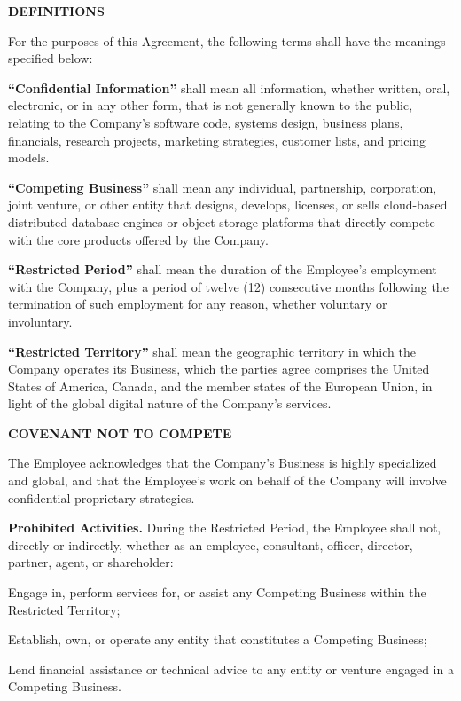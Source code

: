 \documentclass[11pt,a4paper]{article}
\begin{document}
\begin{clauses}
    \item \textbf{DEFINITIONS}
    \label{sec:definitions}
    
    For the purposes of this Agreement, the following terms shall have the meanings specified below:
    
    \begin{clauses}
        \item \textbf{``Confidential Information''} shall mean all information, whether written, oral, electronic, or in any other form, that is not generally known to the public, relating to the Company's software code, systems design, business plans, financials, research projects, marketing strategies, customer lists, and pricing models.
        
        \item \textbf{``Competing Business''} shall mean any individual, partnership, corporation, joint venture, or other entity that designs, develops, licenses, or sells cloud-based distributed database engines or object storage platforms that directly compete with the core products offered by the Company.
        
        \item \textbf{``Restricted Period''} shall mean the duration of the Employee's employment with the Company, plus a period of twelve (12) consecutive months following the termination of such employment for any reason, whether voluntary or involuntary.
        
        \item \textbf{``Restricted Territory''} shall mean the geographic territory in which the Company operates its Business, which the parties agree comprises the United States of America, Canada, and the member states of the European Union, in light of the global digital nature of the Company's services.
    \end{clauses}

    \item \textbf{COVENANT NOT TO COMPETE}
    \label{sec:noncompete}
    
    The Employee acknowledges that the Company's Business is highly specialized and global, and that the Employee's work on behalf of the Company will involve confidential proprietary strategies.
    
    \begin{clauses}
        \item \textbf{Prohibited Activities.} During the Restricted Period, the Employee shall not, directly or indirectly, whether as an employee, consultant, officer, director, partner, agent, or shareholder:
        \begin{clauses}
            \item Engage in, perform services for, or assist any Competing Business within the Restricted Territory;
            \item Establish, own, or operate any entity that constitutes a Competing Business;
            \item Lend financial assistance or technical advice to any entity or venture engaged in a Competing Business.
        \end{clauses}
        

\end{clauses}
\end{clauses}
\end{document}
